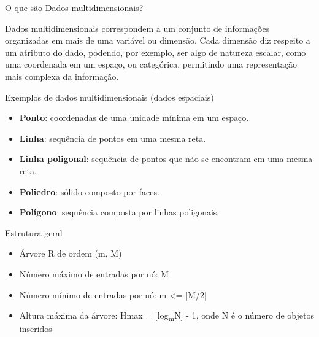 \documentclass[compress,aspectratio=169]{beamer}
\begin{document}
\begin{frame}{O que são Dados multidimensionais?}

    \begin{justify}
    Dados multidimensionais correspondem a um conjunto de informações organizadas em mais de uma variável ou dimensão. Cada dimensão diz respeito a um atributo do dado, podendo, por exemplo, ser algo de natureza escalar, como uma coordenada em um espaço, ou categórica, permitindo uma representação mais complexa da informação.
    \end{justify}
    
    \begin{center}
          \begin{block}{Exemplos de dados multidimensionais (dados espaciais)}
                \begin{itemize}
                        \item \textbf{Ponto}: coordenadas de uma unidade mínima em um espaço.
                        \item \textbf{Linha}: sequência de pontos em uma mesma reta.
                        \item \textbf{Linha poligonal}: sequência de pontos que não se encontram em uma mesma reta.
                        \item \textbf{Poliedro}: sólido composto por faces.
                        \item \textbf{Polígono}: sequência composta por linhas poligonais.
                \end{itemize}
        \end{block}
    \end{center}
\end{frame}


\begin{frame}{Estrutura geral}
    \begin{justify}
        \begin{itemize}
        \item Árvore R de ordem (m, M)
        \item Número máximo de entradas por nó: M
        \item Número mínimo de entradas por nó: m <= |M/2|
        \item Altura máxima da árvore: Hmax = [log\textsubscript{m}N] - 1, onde N é o número de objetos inseridos
     \end{itemize}
    \end{justify}
\end{frame}
\end{document}
